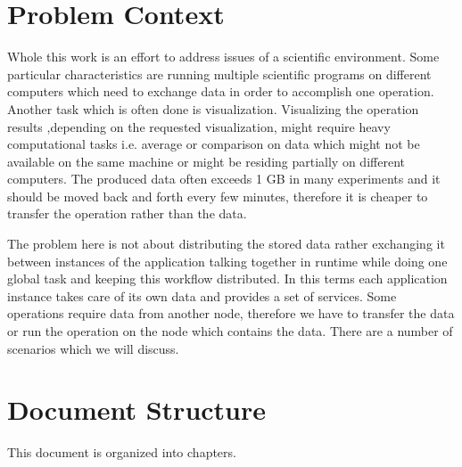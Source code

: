 \section{Problem Context}
Whole this work is an effort to address issues of a scientific environment. Some particular characteristics
are running multiple scientific programs on different computers which need to exchange data in order to
accomplish one operation. Another task which is often done is visualization. Visualizing the operation results
,depending on the requested visualization, might require heavy computational tasks i.e. average or comparison
on data which might not be available on the same machine or might be residing partially on different computers.
The produced data often exceeds 1 GB in many experiments and it should be moved back and forth every few minutes,
therefore it is cheaper to transfer the operation rather than the data.

The problem here is not about distributing the stored data rather exchanging it between instances of the application 
talking together in runtime while doing one global task and keeping this workflow distributed. In this terms each
application instance takes care of its own data and provides a set of services. Some operations require data from
another node, therefore we have to transfer the data or run the operation on the node which contains the data. There
are a number of scenarios which we will discuss.

\section{Document Structure}
This document is organized into  chapters. 